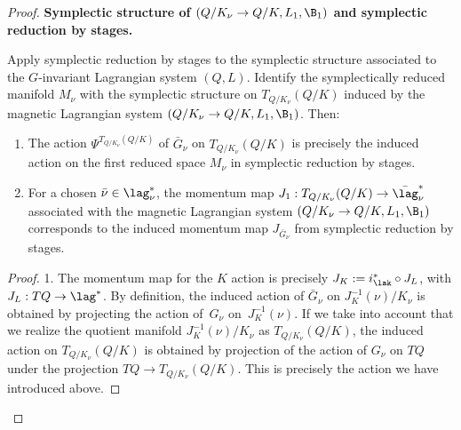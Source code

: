 \begin{proof}
{\bf Symplectic structure of $(Q/K_\nu\to Q/K, L_1,\B_1)$ and symplectic reduction by stages.}
\begin{lemma} Apply symplectic reduction by stages to the symplectic structure associated to the $G$-invariant Lagrangian system $(Q,L)$. Identify the symplectically reduced manifold $M_\nu$ with the symplectic structure on $T_{Q/K_\nu}(Q/K)$ induced by the magnetic Lagrangian system $(Q/K_\nu\to Q/K, L_1,\B_1)$. Then:
\begin{enumerate}\itemsep=0pt
\item[$1.$] The action $\Psi^{T_{Q/K_\nu}(Q/K)}$ of $\bar G_\nu$ on $T_{Q/K_\nu}(Q/K)$ is precisely the induced action on the first reduced space $M_\nu$ in symplectic reduction by stages.
\item[$2.$]  For a chosen $\bar \nu\in \lag_\nu^*$, the momentum map $J_{1}: T_{Q/K_{\nu}}(Q/K)\to \bar\lag_\nu^*$ associated with the magnetic Lagrangian system $(Q/K_\nu\to Q/K, L_1,\B_1)$ corresponds to the induced momentum map $J_{\bar G_\nu}$ from symplectic reduction by stages.
\end{enumerate}
\end{lemma}
\begin{proof}
1. The momentum map for the $K$ action is precisely $J_K:=i^*_\lak \circ J_L$, with $J_L:TQ\to \lag^*$. By def\/inition, the induced action of $\bar G_\nu$  on $J_K^{-1}(\nu)/K_\nu$ is obtained by projecting the action of~$G_\nu$ on~$J_K^{-1}(\nu)$. If we take into account that we realize the quotient manifold $J_K^{-1}(\nu)/K_\nu$ as $T_{Q/K_\nu}(Q/K)$, the induced action on $T_{Q/K_\nu}(Q/K)$ is obtained by projection of the action of $G_\nu$ on $TQ$ under the projection $TQ \to  T_{Q/K_\nu}(Q/K)$. This is precisely the action we have introduced above.


\end{proof}
\end{proof}
